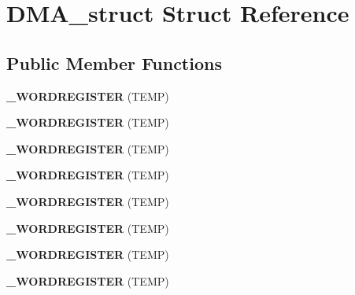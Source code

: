 \hypertarget{struct_d_m_a__struct}{}\section{D\+M\+A\+\_\+struct Struct Reference}
\label{struct_d_m_a__struct}
\subsection*{Public Member Functions}
\begin{DoxyCompactItemize}
\item 
{\bfseries \+\_\+\+W\+O\+R\+D\+R\+E\+G\+I\+S\+T\+ER} (T\+E\+MP)\hypertarget{struct_d_m_a__struct_a83df3301004a4b4f784d8928f90b42dd}{}\label{struct_d_m_a__struct_a83df3301004a4b4f784d8928f90b42dd}

\item 
{\bfseries \+\_\+\+W\+O\+R\+D\+R\+E\+G\+I\+S\+T\+ER} (T\+E\+MP)\hypertarget{struct_d_m_a__struct_a83df3301004a4b4f784d8928f90b42dd}{}\label{struct_d_m_a__struct_a83df3301004a4b4f784d8928f90b42dd}

\item 
{\bfseries \+\_\+\+W\+O\+R\+D\+R\+E\+G\+I\+S\+T\+ER} (T\+E\+MP)\hypertarget{struct_d_m_a__struct_a83df3301004a4b4f784d8928f90b42dd}{}\label{struct_d_m_a__struct_a83df3301004a4b4f784d8928f90b42dd}

\item 
{\bfseries \+\_\+\+W\+O\+R\+D\+R\+E\+G\+I\+S\+T\+ER} (T\+E\+MP)\hypertarget{struct_d_m_a__struct_a83df3301004a4b4f784d8928f90b42dd}{}\label{struct_d_m_a__struct_a83df3301004a4b4f784d8928f90b42dd}

\item 
{\bfseries \+\_\+\+W\+O\+R\+D\+R\+E\+G\+I\+S\+T\+ER} (T\+E\+MP)\hypertarget{struct_d_m_a__struct_a83df3301004a4b4f784d8928f90b42dd}{}\label{struct_d_m_a__struct_a83df3301004a4b4f784d8928f90b42dd}

\item 
{\bfseries \+\_\+\+W\+O\+R\+D\+R\+E\+G\+I\+S\+T\+ER} (T\+E\+MP)\hypertarget{struct_d_m_a__struct_a83df3301004a4b4f784d8928f90b42dd}{}\label{struct_d_m_a__struct_a83df3301004a4b4f784d8928f90b42dd}

\item 
{\bfseries \+\_\+\+W\+O\+R\+D\+R\+E\+G\+I\+S\+T\+ER} (T\+E\+MP)\hypertarget{struct_d_m_a__struct_a83df3301004a4b4f784d8928f90b42dd}{}\label{struct_d_m_a__struct_a83df3301004a4b4f784d8928f90b42dd}

\item 
{\bfseries \+\_\+\+W\+O\+R\+D\+R\+E\+G\+I\+S\+T\+ER} (T\+E\+MP)\hypertarget{struct_d_m_a__struct_a83df3301004a4b4f784d8928f90b42dd}{}\label{struct_d_m_a__struct_a83df3301004a4b4f784d8928f90b42dd}


\end{DoxyCompactItemize}
